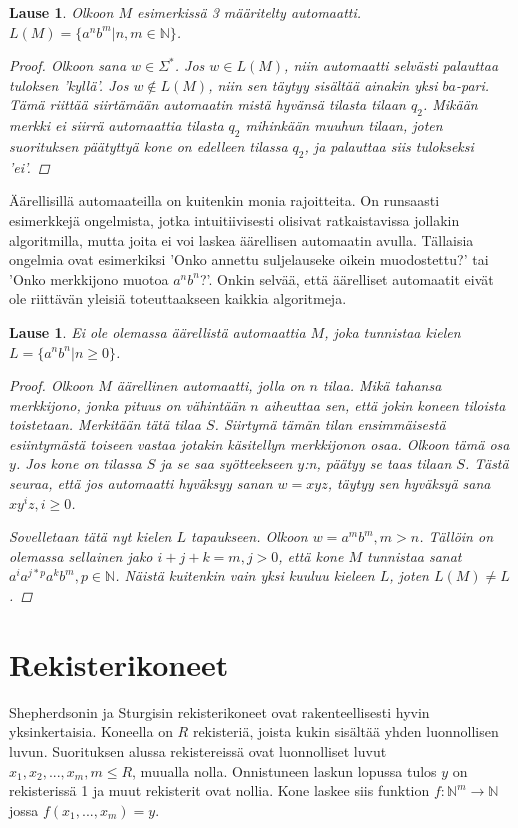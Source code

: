 \documentclass[a4paper, 12pt]{article}
\theoremstyle{definition}
\theoremstyle{plain}
\newtheorem{teor}[mydef]{Lause}
\begin{document}
\begin{teor}
Olkoon $M$ esimerkissä 3 määritelty automaatti. \\ $L(M) = \{a^nb^m | n, m \in \mathbb{N}\}$.
\begin{proof}
Olkoon sana $w \in \Sigma^*$. Jos $w \in L(M)$, niin automaatti selvästi palauttaa tuloksen 'kyllä'. Jos $w \notin L(M)$, niin sen täytyy sisältää ainakin yksi $ba$-pari. Tämä riittää siirtämään automaatin mistä hyvänsä tilasta tilaan $q_2$. Mikään merkki ei siirrä automaattia tilasta $q_2$ mihinkään muuhun tilaan, joten suorituksen päätyttyä kone on edelleen tilassa $q_2$, ja palauttaa siis tulokseksi 'ei'.
\qedhere
\end{proof}
\end{teor}


Äärellisillä automaateilla on kuitenkin monia rajoitteita. On runsaasti esimerkkejä ongelmista, jotka intuitiivisesti olisivat ratkaistavissa jollakin algoritmilla, mutta joita ei voi laskea äärellisen automaatin avulla. Tällaisia ongelmia ovat esimerkiksi 'Onko annettu suljelauseke oikein muodostettu?' tai 'Onko merkkijono muotoa $a^nb^n$?'. Onkin selvää, että äärelliset automaatit eivät ole riittävän yleisiä toteuttaakseen kaikkia algoritmeja.

\begin{teor}
Ei ole olemassa äärellistä automaattia $M$, joka tunnistaa kielen $L = \{a^nb^n | n \geq 0\}$.
\begin{proof}
Olkoon $M$ äärellinen automaatti, jolla on $n$ tilaa. Mikä tahansa merkkijono, jonka pituus on vähintään $n$ aiheuttaa sen, että jokin koneen tiloista toistetaan. Merkitään tätä tilaa $S$. Siirtymä tämän tilan ensimmäisestä esiintymästä toiseen vastaa jotakin käsitellyn merkkijonon osaa. Olkoon tämä osa $y$. Jos kone on tilassa $S$ ja se saa syötteekseen $y$:n, päätyy se taas tilaan $S$. Tästä seuraa, että jos automaatti hyväksyy sanan $w = xyz$, täytyy sen hyväksyä sana $xy^iz, i \geq 0$.

Sovelletaan tätä nyt kielen $L$ tapaukseen. Olkoon $w = a^mb^m, m > n$. Tällöin on olemassa sellainen jako $i + j + k = m, j > 0$, että kone $M$ tunnistaa sanat $a^ia^{j*p}a^kb^m, p \in \mathbb{N}$. Näistä kuitenkin vain yksi kuuluu kieleen $L$, joten $L(M) \neq L$.
\qedhere
\end{proof}
\end{teor}

\section{Rekisterikoneet}
Shepherdsonin ja Sturgisin rekisterikoneet ovat rakenteellisesti hyvin yksinkertaisia. Koneella on $R$ rekisteriä, joista kukin sisältää yhden luonnollisen luvun. Suorituksen alussa rekistereissä ovat luonnolliset luvut $x_1, x_2, ..., x_m, m \leq R$, muualla nolla. Onnistuneen laskun lopussa tulos $y$ on rekisterissä 1 ja muut rekisterit ovat nollia. Kone laskee siis funktion $f:\mathbb{N}^m \rightarrow \mathbb{N}$ jossa $f(x_1, ... , x_m) = y$.
\end{document}
